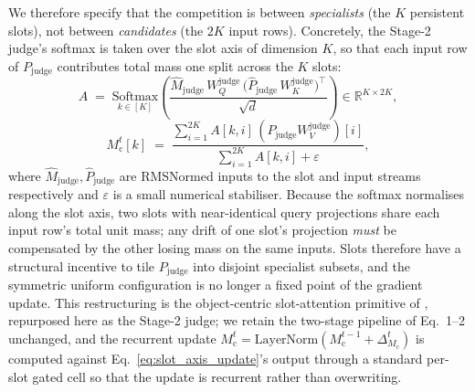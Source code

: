 \documentclass[11pt, a4paper]{article}
\begin{document}
We therefore specify that the competition is between \emph{specialists} (the $K$ persistent slots), not between \emph{candidates} (the $2K$ input rows). Concretely, the Stage-2 judge's softmax is taken over the slot axis of dimension $K$, so that each input row of $P_{\text{judge}}$ contributes total mass one split across the $K$ slots:
\begin{equation}
    A \;=\; \underset{k \in [K]}{\mathrm{Softmax}}\!\left(\frac{\hat{M}_{\text{judge}}\, W_Q^{\text{judge}}\, \bigl(\hat{P}_{\text{judge}}\, W_K^{\text{judge}}\bigr)^\top}{\sqrt{d}}\right) \in \mathbb{R}^{K \times 2K},
    \label{eq:slot_axis_softmax}
\end{equation}
\begin{equation}
    M_{\text{c}}^{t}[k] \;=\; \frac{\sum_{i=1}^{2K} A[k, i]\, (P_{\text{judge}} W_V^{\text{judge}})[i]}{\sum_{i=1}^{2K} A[k, i] + \varepsilon},
    \label{eq:slot_axis_update}
\end{equation}
where $\hat{M}_{\text{judge}}, \hat{P}_{\text{judge}}$ are RMSNormed inputs to the slot and input streams respectively and $\varepsilon$ is a small numerical stabiliser. Because the softmax normalises along the slot axis, two slots with near-identical query projections share each input row's total unit mass; any drift of one slot's projection \emph{must} be compensated by the other losing mass on the same inputs. Slots therefore have a structural incentive to tile $P_{\text{judge}}$ into disjoint specialist subsets, and the symmetric uniform configuration is no longer a fixed point of the gradient update. This restructuring is the object-centric slot-attention primitive of \cite{locatello2020slot}, repurposed here as the Stage-2 judge; we retain the two-stage pipeline of Eq.~1--2 unchanged, and the recurrent update $M_{\text{c}}^{t} = \mathrm{LayerNorm}(M_{\text{c}}^{t-1} + \Delta_{M_\text{c}}^{t})$ is computed against Eq.~\ref{eq:slot_axis_update}'s output through a standard per-slot gated cell so that the update is recurrent rather than overwriting.
\end{document}
